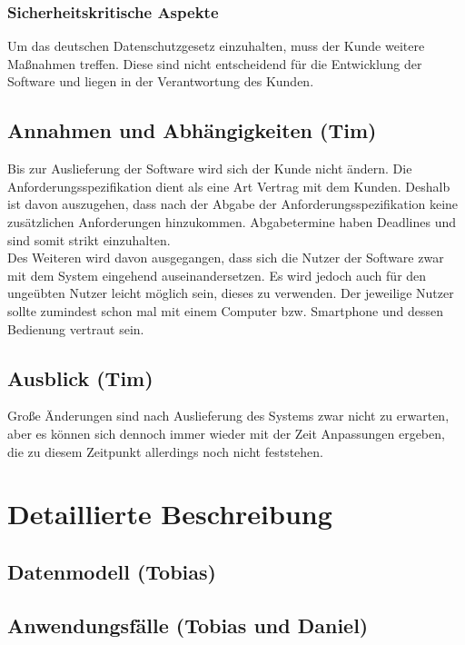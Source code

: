 \documentclass[fontsize=12pt,paper=a4,twoside]{scrartcl}
\begin{document}
\subsubsection{Sicherheitskritische Aspekte} \label{subsubsec:SicherheitsAspekte} Um das deutschen Datenschutzgesetz einzuhalten, muss der Kunde weitere Maßnahmen treffen. Diese sind nicht entscheidend für die Entwicklung der Software und liegen in der Verantwortung des Kunden.

\subsection{Annahmen und Abhängigkeiten (Tim)} \label{subsec:Annahmen} Bis zur Auslieferung der Software wird sich der Kunde nicht ändern. Die Anforderungsspezifikation dient als eine Art Vertrag mit dem Kunden. Deshalb ist davon auszugehen, dass nach der Abgabe der Anforderungsspezifikation keine zusätzlichen Anforderungen hinzukommen. Abgabetermine haben Deadlines und sind somit strikt einzuhalten.\\
Des Weiteren wird davon ausgegangen, dass sich die Nutzer der Software zwar mit dem System eingehend auseinandersetzen. Es wird jedoch auch für den ungeübten Nutzer leicht möglich sein, dieses zu verwenden. Der jeweilige Nutzer sollte zumindest schon mal mit einem Computer bzw. Smartphone und dessen Bedienung vertraut sein.\\


\subsection{Ausblick (Tim)} \label{subsec:Ausblick} Große Änderungen sind nach Auslieferung des Systems zwar nicht zu erwarten, aber es können sich dennoch immer wieder mit der Zeit Anpassungen ergeben, die zu diesem Zeitpunkt allerdings noch nicht feststehen.

\section{Detaillierte Beschreibung}
\label{ch:DetaillierteBeschreibung}


\subsection{Datenmodell (Tobias)}


\subsection{Anwendungsfälle (Tobias und Daniel)}
\end{document}
